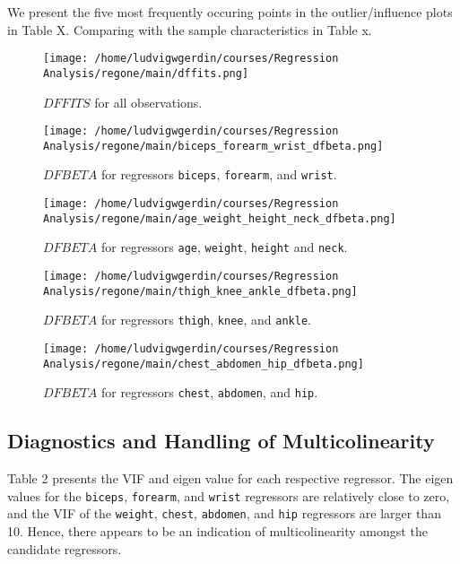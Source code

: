\documentclass[11pt]{article}
\begin{document}
We present the five most frequently occuring points in the outlier/influence plots in Table X. 
Comparing with the sample characteristics in Table x.



\begin{figure}[h]
\centering
\texttt{[image: /home/ludvigwgerdin/courses/Regression Analysis/regone/main/dffits.png]}
\caption{\label{fig:org951ab4c}
\(DFFITS\) for all observations.}
\end{figure}

\begin{figure}[h]
\centering
\texttt{[image: /home/ludvigwgerdin/courses/Regression Analysis/regone/main/biceps\_forearm\_wrist\_dfbeta.png]}
\caption{\label{fig:org5f125da}
\(DFBETA\) for regressors \texttt{biceps}, \texttt{forearm}, and \texttt{wrist}.}
\end{figure}

\begin{figure}[h]
\centering
\texttt{[image: /home/ludvigwgerdin/courses/Regression Analysis/regone/main/age\_weight\_height\_neck\_dfbeta.png]}
\caption{\label{fig:org45580f9}
\(DFBETA\) for regressors \texttt{age}, \texttt{weight}, \texttt{height} and \texttt{neck}.}
\end{figure}

\begin{figure}[h]
\centering
\texttt{[image: /home/ludvigwgerdin/courses/Regression Analysis/regone/main/thigh\_knee\_ankle\_dfbeta.png]}
\caption{\label{fig:orgd80225a}
\(DFBETA\) for regressors \texttt{thigh}, \texttt{knee}, and \texttt{ankle}.}
\end{figure}

\begin{figure}[h]
\centering
\texttt{[image: /home/ludvigwgerdin/courses/Regression Analysis/regone/main/chest\_abdomen\_hip\_dfbeta.png]}
\caption{\label{fig:org8ce1511}
\(DFBETA\) for regressors \texttt{chest}, \texttt{abdomen}, and \texttt{hip}.}
\end{figure}

\subsection{Diagnostics and Handling of Multicolinearity}
\label{sec:orgc9c50ee}

Table 2 presents the VIF and eigen value for each respective regressor. The eigen values for the \texttt{biceps},
\texttt{forearm}, and \texttt{wrist} regressors are relatively close to zero, and the VIF of the \texttt{weight},
\texttt{chest}, \texttt{abdomen}, and \texttt{hip} regressors are larger than 10. Hence, there appears 
to be an indication of multicolinearity amongst the candidate regressors.
\end{document}
